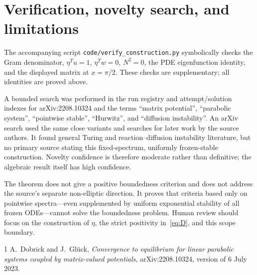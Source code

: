 \documentclass[11pt,a4paper]{article}
\begin{document}
\section{Verification, novelty search, and limitations}

The accompanying script \texttt{code/verify\_construction.py} symbolically
checks the Gram denominator, $\eta^Tu=1$, $\eta^Tw=0$, $N^2=0$, the PDE
eigenfunction identity, and the displayed matrix at $x=\pi/2$.  These checks
are supplementary; all identities are proved above.

A bounded search was performed in the run registry and attempt/solution
indexes for arXiv:2208.10324 and the terms ``matrix potential'', ``parabolic
system'', ``pointwise stable'', ``Hurwitz'', and ``diffusion instability''.
An arXiv search used the same close variants and searches for later work by
the source authors.  It found general Turing and reaction--diffusion
instability literature, but no primary source stating this fixed-spectrum,
uniformly frozen-stable construction.  Novelty confidence is therefore
moderate rather than definitive; the algebraic result itself has high
confidence.

The theorem does not give a positive boundedness criterion and does not address
the source's separate non-elliptic direction.  It proves that criteria based
only on pointwise spectra---even supplemented by uniform exponential stability
of all frozen ODEs---cannot solve the boundedness problem.  Human review should
focus on the construction of $\eta$, the strict positivity in~\eqref{eq:D},
and this scope boundary.

\begin{thebibliography}{1}
A.~Dobrick and J.~Gl\"uck,
\emph{Convergence to equilibrium for linear parabolic systems coupled by
matrix-valued potentials}, arXiv:2208.10324, version of 6 July 2023.
\end{thebibliography}
\end{document}
